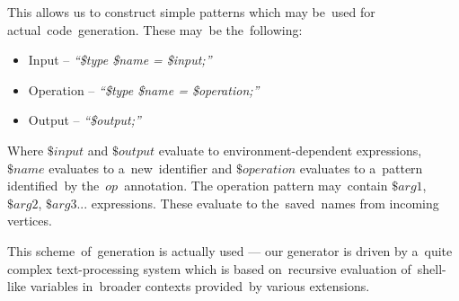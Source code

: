 This allows us to construct simple patterns which may be~used for actual~code~generation. These may~be the~following:

\begin{itemize}
  \item Input -- \emph{``\$type \$name = \$input;''}
  \item Operation -- \emph{``\$type \$name = \$operation;''}
  \item Output -- \emph{``\$output;''}
\end{itemize}

Where $\$input$ and $\$output$ evaluate to environment-dependent expressions, $\$name$ evaluates to a~new~identifier and $\$operation$ evaluates to a~pattern identified~by the~$op$~annotation. The operation pattern may~contain $\$arg1$, $\$arg2$, $\$arg3$... expressions. These evaluate to the~saved~names from incoming vertices.


This scheme~of~generation is actually used --- our generator is driven by a~quite complex text-processing system which is based on~recursive evaluation of~shell-like variables in~broader contexts provided~by various extensions.

